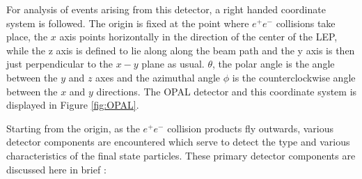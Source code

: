 For analysis of events arising from this detector, a right handed coordinate system is followed. The origin is fixed at the point where $e^{+}e^{-}$ collisions take place, the $x$ axis points horizontally in the direction of the center of the LEP, while the z axis is defined to lie along along the beam path and the y axis is then just perpendicular to the $x-y$ plane as usual. $\theta$, the polar angle is the angle between the $y$ and $z$ axes and the azimuthal angle $\phi$ is the counterclockwise angle between the $x$ and $y$ directions. The OPAL detector and this coordinate system is displayed in Figure \ref{fig:OPAL}.

Starting from the origin, as the $e^{+}e^{-}$ collision products fly outwards, various detector components are encountered which serve to detect the type and various characteristics of the final state particles. These primary detector components are discussed here in brief \cite{UB,1991275}:
